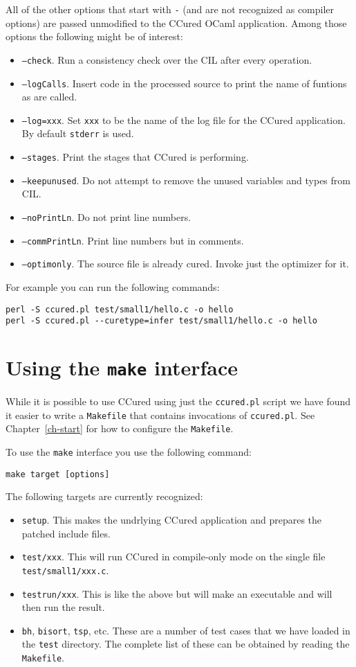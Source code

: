 \documentclass{book}
\def\t#1{{\tt #1}}
\def\chref#1{Chapter~\ref{ch-#1}}
\begin{document}
 All of the other options that start with \t{-} (and are not recognized as
compiler options) are passed unmodified to the CCured OCaml application. Among
those options the following might be of interest:
\begin{itemize}
\item \t{--check}. Run a consistency check over the CIL after every operation. 
\item \t{--logCalls}. Insert code in the processed source to print the name of
funtions as are called. 
\item \t{--log=xxx}. Set \t{xxx} to be the name of the log file for the CCured
application. By default \t{stderr} is used.
\item \t{--stages}. Print the stages that CCured is performing.
\item \t{--keepunused}. Do not attempt to remove the unused variables and
types from CIL. 
\item \t{--noPrintLn}. Do not print line numbers.
\item \t{--commPrintLn}. Print line numbers but in comments.
\item \t{--optimonly}. The source file is already cured. Invoke just the
                      optimizer for it.
\end{itemize}

 For example you can run the following commands:
\begin{verbatim}
perl -S ccured.pl test/small1/hello.c -o hello
perl -S ccured.pl --curetype=infer test/small1/hello.c -o hello
\end{verbatim}

 \section{Using the {\tt make} interface}

 While it is possible to use CCured using just the \t{ccured.pl} script we
have found it easier to write a \t{Makefile} that contains invocations of
\t{ccured.pl}. See \chref{start} for how to configure the
\t{Makefile}. 
 
 To use the \t{make} interface you use the following command:
\begin{verbatim}
make target [options]
\end{verbatim}

 The following targets are currently recognized:
\begin{itemize}
\item \t{setup}. This makes the undrlying CCured application and prepares the
patched include files.
\item \t{test/xxx}.  This will run CCured in compile-only mode on the single
file \t{test/small1/xxx.c}. 
\item \t{testrun/xxx}. This is like the above but will make an executable and
will then run the result. 
\item \t{bh}, \t{bisort}, \t{tsp}, etc. These are a number of test cases that
we have loaded in the \t{test} directory. The complete list of these can be
obtained by reading the \t{Makefile}.
\end{itemize}
\end{document}
